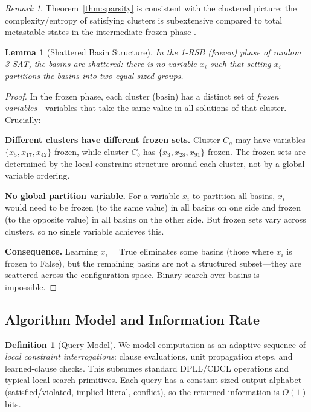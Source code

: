 \documentclass[11pt,a4paper]{article}
\theoremstyle{plain}
\newtheorem{lemma}[theorem]{Lemma}
\theoremstyle{definition}
\newtheorem{definition}[theorem]{Definition}
\theoremstyle{remark}
\newtheorem{remark}[theorem]{Remark}
\begin{document}
\begin{remark}
Theorem~\ref{thm:sparsity} is consistent with the clustered picture: the complexity/entropy of satisfying clusters is subextensive compared to total metastable states in the intermediate frozen phase \cite{mezard2002}.
\end{remark}

\begin{lemma}[Shattered Basin Structure]
\label{lem:shattered}
In the 1-RSB (frozen) phase of random 3-SAT, the basins are \emph{shattered}: there is no variable $x_i$ such that setting $x_i$ partitions the basins into two equal-sized groups.
\end{lemma}

\begin{proof}
In the frozen phase, each cluster (basin) has a distinct set of \emph{frozen variables}---variables that take the same value in all solutions of that cluster. Crucially:

\textbf{Different clusters have different frozen sets.} Cluster $C_a$ may have variables $\{x_5, x_{17}, x_{42}\}$ frozen, while cluster $C_b$ has $\{x_3, x_{28}, x_{91}\}$ frozen. The frozen sets are determined by the local constraint structure around each cluster, not by a global variable ordering.

\textbf{No global partition variable.} For a variable $x_i$ to partition all basins, $x_i$ would need to be frozen (to the same value) in all basins on one side and frozen (to the opposite value) in all basins on the other side. But frozen sets vary across clusters, so no single variable achieves this.

\textbf{Consequence.} Learning $x_i = \text{True}$ eliminates some basins (those where $x_i$ is frozen to False), but the remaining basins are not a structured subset---they are scattered across the configuration space. Binary search over basins is impossible.
\end{proof}

\subsection{Algorithm Model and Information Rate}

\begin{definition}[Query Model]
\label{def:query}
We model computation as an adaptive sequence of \emph{local constraint interrogations}: clause evaluations, unit propagation steps, and learned-clause checks. This subsumes standard DPLL/CDCL operations and typical local search primitives. Each query has a constant-sized output alphabet (satisfied/violated, implied literal, conflict), so the returned information is $O(1)$ bits.
\end{definition}
\end{document}
